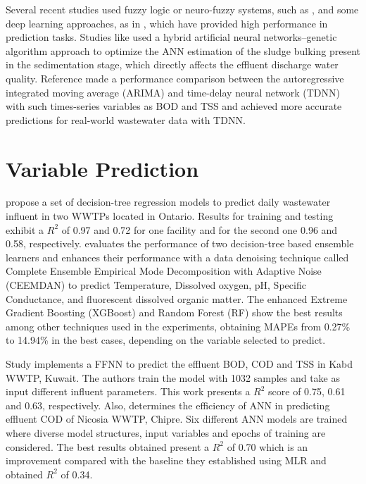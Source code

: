 Several recent studies used fuzzy logic or neuro-fuzzy systems, such as \cite{Nourani2018,Nadiri2018,Han2018}, and some deep learning approaches, as in \cite{Guo2015,Alsina2018,Dairi2019}, which have provided high performance in prediction tasks. Studies like \cite{Bagheri2015} used a hybrid artificial neural networks–genetic algorithm approach to optimize the ANN estimation of the sludge bulking present in the sedimentation stage, which directly affects the effluent discharge water quality. Reference \cite{Dellana2009} made a performance comparison between the autoregressive integrated moving average (ARIMA) and time-delay neural network (TDNN) with such times-series variables as BOD and TSS and achieved more accurate predictions for real-world wastewater data with TDNN.

\section{Variable Prediction}
\label{s:RelatedWorks-variablePrediction}

\cite{Zhou2019} propose a set of decision-tree regression models to predict daily wastewater influent in two \ac{WWTP}s located in Ontario. Results for training and testing exhibit a \begin{math}R^2\end{math} of 0.97 and 0.72 for one facility and for the second one 0.96 and 0.58, respectively. \cite{Lu2020} evaluates the performance of two decision-tree based ensemble learners and enhances their performance with a data denoising technique called Complete Ensemble Empirical Mode Decomposition with Adaptive Noise (CEEMDAN) to predict Temperature, Dissolved oxygen, pH, Specific Conductance, and fluorescent dissolved organic matter. The enhanced Extreme Gradient Boosting (XGBoost) and Random Forest (RF) show the best results among other techniques used in the experiments, obtaining MAPEs from 0.27\% to 14.94\% in the best cases, depending on the variable selected to predict.

Study \cite{Alsulaili2021} implements a FFNN to predict the effluent BOD, \ac{COD} and TSS in Kabd WWTP, Kuwait. The authors train the model with 1032 samples and take as input different influent parameters. This work presents a \begin{math}R^2\end{math} score of 0.75, 0.61 and 0.63, respectively. Also, \cite{Abba2017} determines the efficiency of ANN in predicting effluent \ac{COD} of Nicosia WWTP, Chipre. Six different ANN models are trained where diverse model structures, input variables and epochs of training are considered. The best results obtained present a \begin{math}R^2\end{math} of 0.70 which is an improvement compared with the baseline they established using MLR and obtained \begin{math}R^2\end{math} of 0.34.

